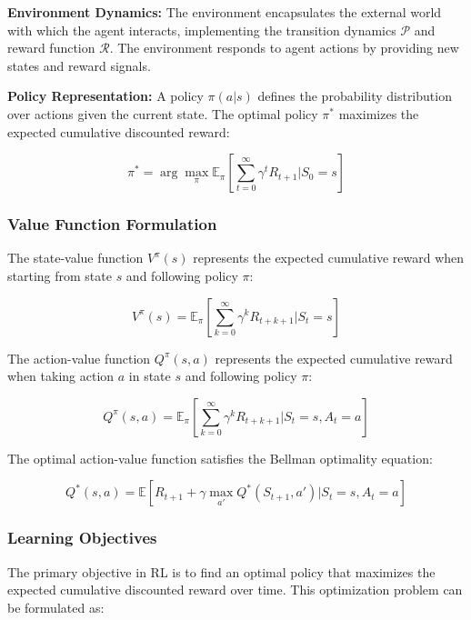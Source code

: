 \documentclass[12pt]{article}
\begin{document}
{{{\textbf{Environment Dynamics:}
The environment encapsulates the external world with which the agent interacts, implementing the transition dynamics $\mathcal{P}$ and reward function $\mathcal{R}$. The environment responds to agent actions by providing new states and reward signals.

\textbf{Policy Representation:}
A policy $\pi(a|s)$ defines the probability distribution over actions given the current state. The optimal policy $\pi^*$ maximizes the expected cumulative discounted reward:

\begin{equation}
\pi^* = \arg\max_{\pi} \mathbb{E}_{\pi}\left[\sum_{t=0}^{\infty} \gamma^t R_{t+1} | S_0 = s\right]
\end{equation}

\subsubsection{Value Function Formulation}

The state-value function $V^{\pi}(s)$ represents the expected cumulative reward when starting from state $s$ and following policy $\pi$:

\begin{equation}
V^{\pi}(s) = \mathbb{E}_{\pi}\left[\sum_{k=0}^{\infty} \gamma^k R_{t+k+1} | S_t = s\right]
\end{equation}

The action-value function $Q^{\pi}(s,a)$ represents the expected cumulative reward when taking action $a$ in state $s$ and following policy $\pi$:

\begin{equation}
Q^{\pi}(s,a) = \mathbb{E}_{\pi}\left[\sum_{k=0}^{\infty} \gamma^k R_{t+k+1} | S_t = s, A_t = a\right]
\end{equation}

The optimal action-value function satisfies the Bellman optimality equation:

\begin{equation}
Q^*(s,a) = \mathbb{E}\left[R_{t+1} + \gamma \max_{a'} Q^*(S_{t+1}, a') | S_t = s, A_t = a\right]
\end{equation}

\subsubsection{Learning Objectives}

The primary objective in RL is to find an optimal policy that maximizes the expected cumulative discounted reward over time. This optimization problem can be formulated as:

}}}
\end{document}
